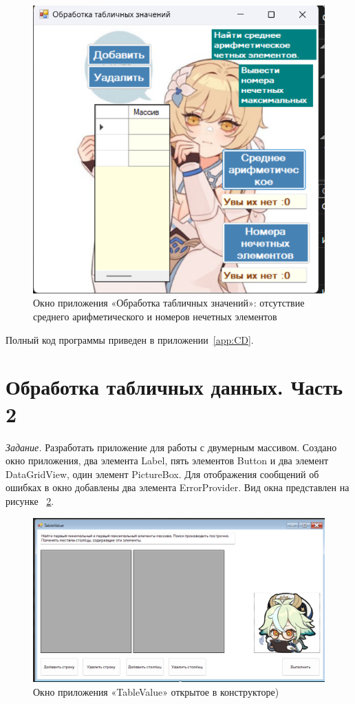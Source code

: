 \documentclass[bachelor, och, pract, times]{SCWorks}
\begin{document}
\begin{figure}[H]
    \centering
    \includegraphics[scale=0.7]{Скрины/Снимок экрана 2025-01-05 000342.png}
    \caption{Окно приложения «Обработка табличных значений»: отсутствие среднего арифметического и номеров нечетных элементов}\label{fig:table1-05}
\end{figure}


Полный код программы приведен в приложении~\ref{app:CD}.

\section{Обработка табличных данных. Часть 2}

\textsl{Задание.} Разработать приложение для работы с двумерным массивом.
Создано окно приложения, два элемента Label, пять элементов Button и два элемент DataGridView, один элемент PictureBox. Для отображения
сообщений об ошибках в окно добавлены два элемента ErrorProvider. Вид окна
представлен на рисунке ~\ref{fig:table2-01}.

\begin{figure}[H]
    \centering
    \includegraphics[scale=0.5]{Скрины/Снимок экрана 2025-01-05 114416.png}
    \caption{Окно приложения «TableValue» открытое в
конструкторе)}\label{fig:table2-01}
\end{figure}
\end{document}
